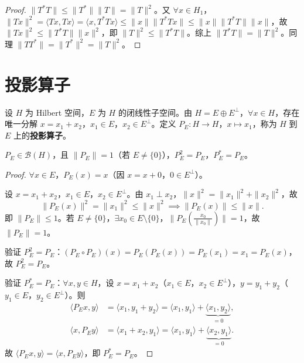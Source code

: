 \documentclass[lang=cn,a4paper,newtx,section]{elegantbook}
\begin{document}
\begin{proof}
  $\|T^*T\|\leq\|T^*\|\|T\|=\|T\|^2$。又 $\forall x\in H_1$，$\|Tx\|^2=\langle Tx,Tx\rangle=\langle x,T^*Tx\rangle\leq\|x\|\|T^*Tx\|\leq\|x\|\|T^*T\|\|x\|$，故 $\|Tx\|^2\leq\|T^*T\|\|x\|^2$，即 $\|T\|^2\leq\|T^*T\|$。综上 $\|T^*T\|=\|T\|^2$。同理 $\|TT^*\|=\|T^*\|^2=\|T\|^2$。
\end{proof}

\section{投影算子}

\begin{definition}[投影算子]
  设 $H$ 为 Hilbert 空间，$E$ 为 $H$ 的闭线性子空间。由 $H=E\oplus E^\perp$，$\forall x\in H$，存在唯一分解 $x=x_1+x_2$，$x_1\in E$，$x_2\in E^\perp$。定义 $P_E:H\to H$，$x\mapsto x_1$，称为 $H$ 到 $E$ 上的\textbf{投影算子}。
\end{definition}

\begin{proposition}
  $P_E\in\mathcal{B}(H)$，且 $\|P_E\|=1$（若 $E\neq\{0\}$），$P_E^2=P_E$，$P_E^*=P_E$。
\end{proposition}

\begin{proof}
  $\forall x\in E$，$P_E(x)=x$（因 $x=x+0$，$0\in E^\perp$）。

  设 $x=x_1+x_2$，$x_1\in E$，$x_2\in E^\perp$。由 $x_1\perp x_2$，$\|x\|^2=\|x_1\|^2+\|x_2\|^2$，故
  \[
    \|P_E(x)\|^2=\|x_1\|^2\leq\|x\|^2\implies\|P_E(x)\|\leq\|x\|.
  \]
  即 $\|P_E\|\leq 1$。若 $E\neq\{0\}$，$\exists x_0\in E\setminus\{0\}$，$\|P_E(\frac{x_0}{\|x_0\|})\|=1$，故 $\|P_E\|=1$。

  验证 $P_E^2=P_E$：$(P_E\circ P_E)(x)=P_E(P_E(x))=P_E(x_1)=x_1=P_E(x)$，故 $P_E^2=P_E$。

  验证 $P_E^*=P_E$：$\forall x,y\in H$，设 $x=x_1+x_2$（$x_1\in E$，$x_2\in E^\perp$），$y=y_1+y_2$（$y_1\in E$，$y_2\in E^\perp$）。则
  \begin{align*}
    \langle P_Ex,y\rangle&=\langle x_1,y_1+y_2\rangle=\langle x_1,y_1\rangle+\underbrace{\langle x_1,y_2\rangle}_{=0},\\
    \langle x,P_Ey\rangle&=\langle x_1+x_2,y_1\rangle=\langle x_1,y_1\rangle+\underbrace{\langle x_2,y_1\rangle}_{=0}.
  \end{align*}
  故 $\langle P_Ex,y\rangle=\langle x,P_Ey\rangle$，即 $P_E^*=P_E$。
\end{proof}
\end{document}
